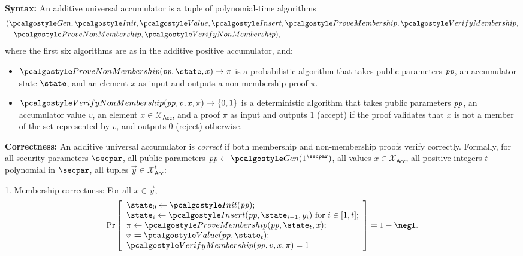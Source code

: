 \ifsolutions
\begin{mysolution}
  \textbf{Syntax:} An additive universal accumulator is a tuple of polynomial-time algorithms 
  \begin{align*}
    &(\algo{Gen}, \algo{Init}, \algo{Value}, \algo{Insert}, \algo{ProveMembership}, \algo{VerifyMembership},\\
    &\quad \algo{ProveNonMembership}, \algo{VerifyNonMembership}),
  \end{align*}
  where the first six algorithms are as in the additive positive accumulator, and:
  \begin{itemize}
    \item $\algo{ProveNonMembership}(\params, \state, x) \rightarrow \pi$ is a probabilistic algorithm that takes public parameters $\mathit{pp}$, an accumulator state $\state$, and an element $x$ as input and outputs a non-membership proof $\pi$.
    \item $\algo{VerifyNonMembership}(\params, v, x, \pi) \rightarrow \{0, 1\}$ is a deterministic algorithm that takes public parameters $\mathit{pp}$, an accumulator value $v$, an element $x \in \mathcal{X}_\mathsf{Acc}$, and a proof $\pi$ as input and outputs $1$ (accept) if the proof validates that $x$ is not a member of the set represented by $v$, and outputs $0$ (reject) otherwise.
  \end{itemize}
  
  \textbf{Correctness:} An additive universal accumulator is \emph{correct} if both membership and non-membership proofs verify correctly.
  Formally, for all security parameters $\secpar$, all public parameters $\params \gets \algo{Gen}(1^\secpar)$, all values $x \in \mathcal{X}_\mathsf{Acc}$, all positive integers $t$ polynomial in $\secpar$, all tuples $\vec{y} \in \mathcal{X}_\mathsf{Acc}^{t}$:
  
  1. Membership correctness: For all $x \in \vec{y}$,
  \[
    \Pr\left[
    \begin{array}{l}
      \state_0 \gets \algo{Init}(\params); \\
      \state_i \gets \algo{Insert}(\params, \state_{i-1}, y_i) \text{ for } i \in [1, t]; \\
      \pi \gets \algo{ProveMembership}(\params, \state_t, x); \\
      v \defeq \algo{Value}(\params, \state_t); \\
      \algo{VerifyMembership}(\params, v, x, \pi) = 1
    \end{array}
    \right] = 1 - \negl.
  \]
  

\end{mysolution}
